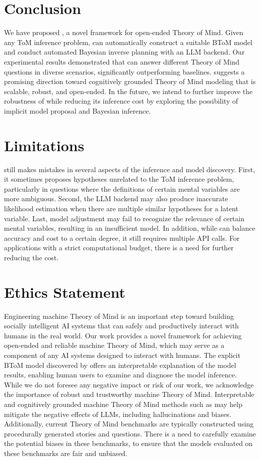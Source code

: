 \section{Conclusion}

We have proposed \ours, a novel framework for open-ended Theory of Mind. Given any ToM inference problem, \ours can automatically construct a suitable BToM model and conduct automated Bayesian inverse planning with an LLM backend. Our experimental results demonstrated that \ours can answer different Theory of Mind questions in diverse scenarios, significantly outperforming baselines. \ours suggests a promising direction toward cognitively grounded Theory of Mind modeling that is scalable, robust, and open-ended. In the future, we intend to further improve the robustness of \ours while reducing its inference cost by exploring the possibility of implicit model proposal and Bayesian inference.

\section*{Limitations}

\ours still makes mistakes in several aspects of the inference and model discovery. First, it sometimes proposes hypotheses unrelated to the ToM inference problem, particularly in questions where the definitions of certain mental variables are more ambiguous. Second, the LLM backend may also produce inaccurate likelihood estimation when there are multiple similar hypotheses for a latent variable. Last, model adjustment may fail to recognize the relevance of certain mental variables, resulting in an insufficient model. In addition, while \ours can balance accuracy and cost to a certain degree, it still requires multiple API calls. For applications with a strict computational budget, there is a need for further reducing the cost.

\section*{Ethics Statement}

Engineering machine Theory of Mind is an important step toward building socially intelligent AI systems that can safely and productively interact with humans in the real world. Our work provides a novel framework for achieving open-ended and reliable machine Theory of Mind, which may serve as a component of any AI systems designed to interact with humans. The explicit BToM model discovered by \ours offers an interpretable explanation of the model results, enabling human users to examine and diagnose the model inference. While we do not foresee any negative impact or risk of our work, we acknowledge the importance of robust and trustworthy machine Theory of Mind. Interpretable and cognitively grounded machine Theory of Mind methods such as \ours may help mitigate the negative effects of LLMs, including hallucinations and biases. Additionally, current Theory of Mind benchmarks are typically constructed using procedurally generated stories and questions. There is a need to carefully examine the potential biases in these benchmarks, to ensure that the models evaluated on these benchmarks are fair and unbiased.